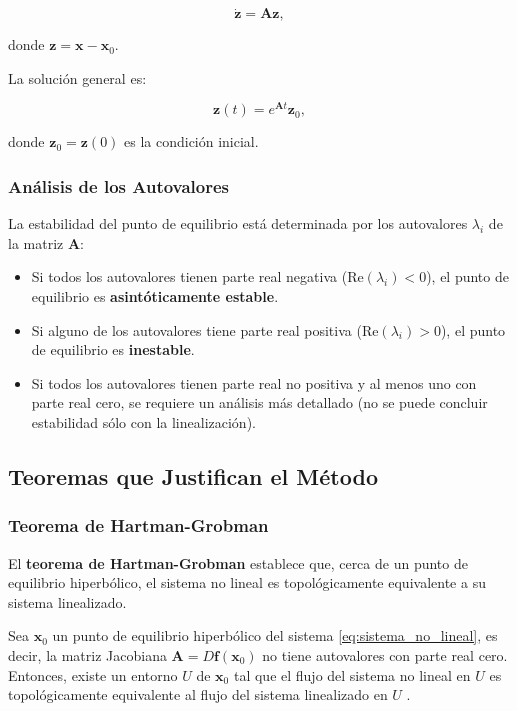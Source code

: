 \begin{equation}
    \dot{\mathbf{z}} = \mathbf{A} \mathbf{z},
\end{equation}

donde $\mathbf{z} = \mathbf{x} - \mathbf{x}_0$.

La solución general es:

\begin{equation}
    \mathbf{z}(t) = e^{\mathbf{A} t} \mathbf{z}_0,
\end{equation}

donde $\mathbf{z}_0 = \mathbf{z}(0)$ es la condición inicial.

\subsubsection{Análisis de los Autovalores}

La estabilidad del punto de equilibrio está determinada por los autovalores $\lambda_i$ de la matriz $\mathbf{A}$:

\begin{itemize}
    \item Si todos los autovalores tienen parte real negativa ($\text{Re}(\lambda_i) < 0$), el punto de equilibrio es \textbf{asintóticamente estable}.
    \item Si alguno de los autovalores tiene parte real positiva ($\text{Re}(\lambda_i) > 0$), el punto de equilibrio es \textbf{inestable}.
    \item Si todos los autovalores tienen parte real no positiva y al menos uno con parte real cero, se requiere un análisis más detallado (no se puede concluir estabilidad sólo con la linealización).
\end{itemize}

\subsection{Teoremas que Justifican el Método}

\subsubsection{Teorema de Hartman-Grobman}

El \textbf{teorema de Hartman-Grobman} establece que, cerca de un punto de equilibrio hiperbólico, el sistema no lineal es topológicamente equivalente a su sistema linealizado.

\begin{theorem}
Sea $\mathbf{x}_0$ un punto de equilibrio hiperbólico del sistema \eqref{eq:sistema_no_lineal}, es decir, la matriz Jacobiana $\mathbf{A} = D\mathbf{f}(\mathbf{x}_0)$ no tiene autovalores con parte real cero. Entonces, existe un entorno $U$ de $\mathbf{x}_0$ tal que el flujo del sistema no lineal en $U$ es topológicamente equivalente al flujo del sistema linealizado en $U$ \cite{hartman1960lemma}.
\end{theorem}

